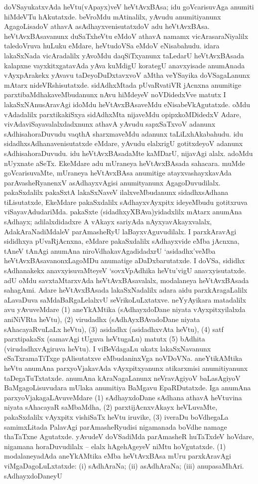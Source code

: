 doVSayukatxvAda heVtu(vApayx)veV heVtAvxBAsa; idu goVcarisuvAga anu\-miti hiMdeVTu hAkutatxde. beVroMdu mAtinalilx, yAvudu anumitiyanunx AgagoLi\-sadoV athavA asAdhayxvenisutatxdoV adu heVtAvxBAsa. heVtAvxBAsavanunx duSaTxheVtu eMdoV athavA namamx vicArasaraNiyalilx taledoVruva huLuku eMdare, heVtu\-doVSa eMdoV eNisabahudu. idara lakaSxNada vicAradalilx yAvoMdu daqSiTxyanunx taLedarU heVtAvxBAsada kalapxne vayxkitxgatavAda yAva kuMdigU korategU anavxyisade anumAnada vAyxpArakekx yAvavu taDeyoDuDxtavxvoV aMtha veYSayika doVSagaLanunx mAtarx nideVRshi\-sutatxde. sidAdhxMtada pUvaRvatiVR jAcnxna anumitige parxtibaMdhakaveMbudanunx nAvu hiMdeyeV noVDidedxVve matutx I lakaSxNAnusAravAgi idoMdu heVtAvxBAsaveMdu eNisabeVkAgutatxde. oMdu vAdadalilx parxtikakiSxya sidAdhxMta nijaveMdu opipx\-koMDi\-dedxV Adare, vivAdaviSayavalalxdadxnunx athavA yAvudu sapxSaTxvoV adanunx sAdhisahoraDuvudu vaqthA sharxmaveMdu adanunx taLiLxhAkabahudu. idu sidadhxsAdhanavenisutatxde \hbox{eMdare}, yAvudu elalxrigU gotitxdeyoV adanunx sAdhisahoraDuvudu. idu heVtAvx\-BAsa\-daMte kaMDarU, nijavAgi alalx. adoMdu nUyxnate aSeTx. EkeMdare adu mUra\-neya heVtAvxBAsada sahacara. muMde goVcarisuvaMte, mUraneya heVtAvxBAsa anu\-mitige atayxvashayxkavAda parAvasheRyanenxV asAdhayxvAgisi anumityanunx AgagoDuvu\-dilalx. pakaSxdalilx pakaSxtA lakaSxNaveV ilalxveMbudanunx sidadhxsAdhana tiLisutatxde, EkeMdare pakaSxdalilx sAdhayxvAyxpitx ideyeMbudu gotitxruva viSayavAdudariMda. pakaSxte (sidadhxyXBAva)yidadxlilx mAtarx anumAna sAdhayx; adilalxdidadxre A vAkayx sariyAda nAyxyavAkayxvalalx, AdakAraNa\-diMdaleV parAmasheRyU laBayxvAguvudilalx. I parxkAravAgi sididhxya pUvaR\-jAcnxna, eMdare pakaSxdalilx sAdhayxvide eMba jAcnxna, tAneV tAnAgi anumAna niroVdhaka\-vAga\-didadxrU `asidadhx'veMba heVtAvxBAsavanonxLagoMDu anumatige aDaDxbarutatxde. I doVSa, sididhx sAdhanakekx anavxyisuvaMteyeV `sovxVpAdhika heVtu'vigU anavxyisutatxde. adU oMdu savxtaMtarxvAda heVtAvxBAsavalalx, modalaneya heVtAvxBAsada sahagAmi. Adare heVtAvxBAsada lakaSxNadalilx adara aidu parxkAragaLalilx aLavaDuva saMdaBaRgaLelalxvU seVri\-koLuLxtatxve. neYyAyikara matadalilx avu yAvuveMdare (1) aneYkAMtika (sAdhayx\-doDane niyata vAyxpitxyilalxda aniNiVRta heVtu), (2) virudadhx (sAdhAyxBAvadoDane \hbox{niyata} sAhacayaRvuLaLx heVtu), (3) asidadhx (asidadhxvAta heVtu), (4) satf parxtipakaSx (sama\-vAgi tUguva heVtugaLu) matutx (5) bAdhita (virudadhxvAgiruva heVtu). I viBeVdagaLu ukatx lakaSxNavanunx eSaTxramaTiTxge pAlisutatxve eMbudaninxVga noVDoVNa. aneYti\-kAMtika heVtu anumAna parxyoVjakavAda vAyxpitxyanunx atikarxmisi anumitiyanunx taDegaTuTxtatxde. anumAna kAraNagaLanunx neVravAgiyoV baLasAgiyoV BaMgagoLisu\-vudara mUlaka anumitiya BaMgavu EpaRDutatxde. Iga anumAna parxyoVjaka\-gaLAvuveMdare (1) sAdhayxdoDane sAdhana athavA heVtuvina niyata sAhacayaR \hbox{saMbaMdha}, (2) parxtijAcnxvAkayx heVLuvaMte, pakaSxdalilx vAyxpitx vishiSaTx heVtu iruvike, (3) iveraDu boVdhegaLa samimxLitada PalavAgi parAmasheRyudisi nigamanada boVdhe namage thaTaTxne Agutatxde. yAvudeV doVSadiMda parAmasheR huTaTxdeV hoVdare, nigamana horaDuvudilalx -- elalx hAgehAgeyeV niMtu hoVgutatxde. (1) modalaneyadAda aneYkAMtika eMba heVtAvxBAsa mUru parxkAravAgi viMgaDagoLuLxtatxde: {\rm(i)} sAdhAraNa; {\rm(ii)} asAdhAraNa; {\rm(iii)} anupasaMhAri. sAdhayxdoDaneyU 